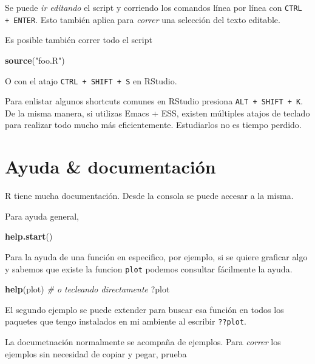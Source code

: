 \documentclass[]{article}
\newenvironment{Shaded}{\begin{snugshade}}{\end{snugshade}}
\newcommand{\KeywordTok}[1]{\textcolor[rgb]{0.13,0.29,0.53}{\textbf{{#1}}}}
\newcommand{\StringTok}[1]{\textcolor[rgb]{0.31,0.60,0.02}{{#1}}}
\newcommand{\CommentTok}[1]{\textcolor[rgb]{0.56,0.35,0.01}{\textit{{#1}}}}
\newcommand{\NormalTok}[1]{{#1}}
\begin{document}
Se puede \emph{ir editando} el script y corriendo los comandos línea por
línea con \texttt{CTRL + ENTER}. Esto también aplica para \emph{correr}
una selección del texto editable.

Es posible también correr todo el script

\begin{Shaded}
\begin{Highlighting}[]
\KeywordTok{source}\NormalTok{(}\StringTok{"foo.R"}\NormalTok{)}
\end{Highlighting}
\end{Shaded}

O con el atajo \texttt{CTRL + SHIFT + S} en RStudio.

Para enlistar algunos shortcuts comunes en RStudio presiona
\texttt{ALT + SHIFT + K}. De la misma manera, si utilizas Emacs + ESS,
existen múltiples atajos de teclado para realizar todo mucho más
eficientemente. Estudiarlos no es tiempo perdido.

\section{Ayuda \& documentación}\label{ayuda-documentacion}

R tiene mucha documentación. Desde la consola se puede accesar a la
misma.

Para ayuda general,

\begin{Shaded}
\begin{Highlighting}[]
\KeywordTok{help.start}\NormalTok{()}
\end{Highlighting}
\end{Shaded}

Para la ayuda de una función en especifico, por ejemplo, si se quiere
graficar algo y sabemos que existe la funcion \texttt{plot} podemos
consultar fácilmente la ayuda.

\begin{Shaded}
\begin{Highlighting}[]
\KeywordTok{help}\NormalTok{(plot)}
\CommentTok{# o tecleando directamente}
\NormalTok{?plot}
\end{Highlighting}
\end{Shaded}

El segundo ejemplo se puede extender para buscar esa función en todos
los paquetes que tengo instalados en mi ambiente al escribir
\texttt{??plot}.

La documetnación normalmente se acompaña de ejemplos. Para \emph{correr}
los ejemplos sin necesidad de copiar y pegar, prueba
\end{document}
